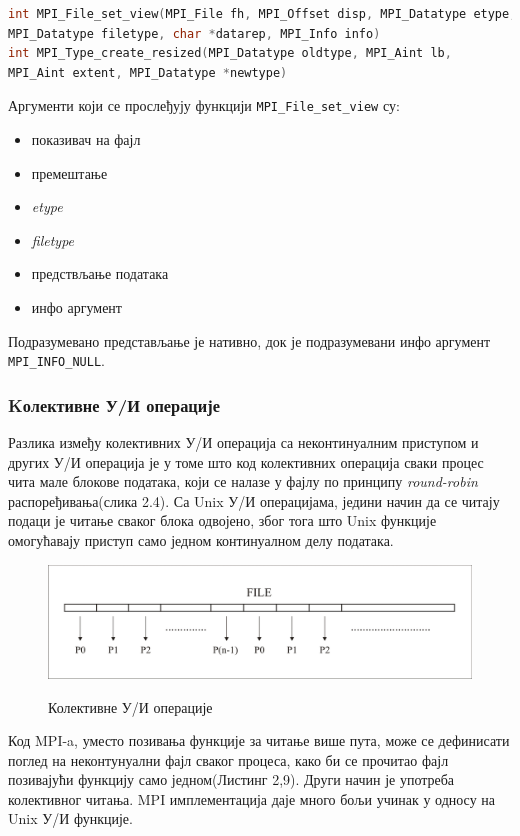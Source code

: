 \begin{lstlisting}[style=nonumbers,frame=single, language=C, caption= MPI функције]
int MPI_File_set_view(MPI_File fh, MPI_Offset disp, MPI_Datatype etype,
MPI_Datatype filetype, char *datarep, MPI_Info info)
int MPI_Type_create_resized(MPI_Datatype oldtype, MPI_Aint lb,
MPI_Aint extent, MPI_Datatype *newtype)
\end{lstlisting}

Аргументи који се прослеђују функцији \texttt{MPI\_File\_set\_view} су:
\begin{itemize}
	\item показивач на фајл
	\item премештање
	\item \textit{etype}
	\item \textit{filetype}
	\item предствљање података
	\item инфо аргумент
\end{itemize}
Подразумевано представљање је нативно, док је подразумевани инфо аргумент \texttt{MPI\_INFO\_NULL}.

\subsubsection{Kолективне У/И операције}

Разлика између колективних У/И операција са неконтинуалним приступом и других У/И операција је у томе што код колективних операција сваки процес чита мале блокове података, који се налазе у фајлу по принципу \textit{round-robin} распоређивања(слика 2.4). Са Unix У/И операцијама, једини начин да се читају подаци је читање сваког блока одвојено, због тога што Unix функције омогућавају приступ само једном континуалном делу података. 

\begin{figure}[h!]
  \centering
      \includegraphics[width=1\textwidth]{slike/block-cyclic.png}\\[1cm]
  \caption{Колективне У/И операције}
\end{figure}

Код MPI-a, уместо позивања функције за читање више пута, може се дефинисати поглед на неконтунуални фајл сваког процеса, како би се прочитао фајл позивајући функцију само једном(Листинг 2,9). Други начин је употреба колективног читања. MPI имплементација даје много бољи учинак у односу на Unix У/И функције.


